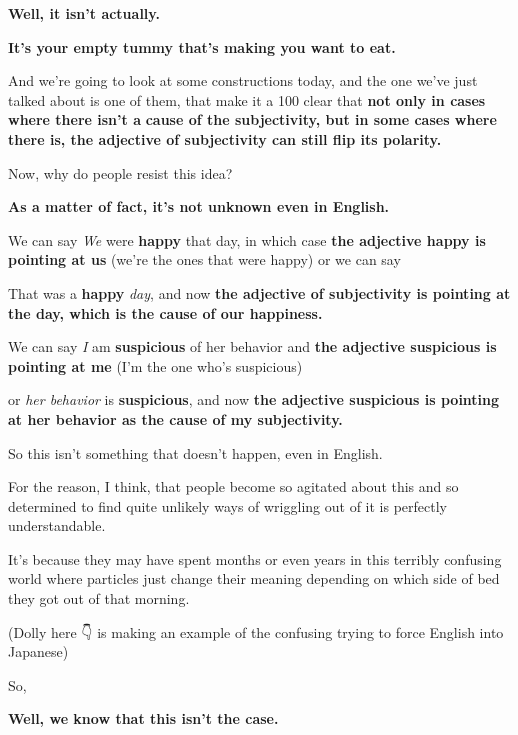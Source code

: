 {\bf Well, it isn't actually.}

{\bf It's your empty tummy that's making you want to eat.}

And we're going to look at some constructions today, and the one we've just talked about is one of them, that make it a 100 clear that {\bf not only in cases where there isn't a} {\bf cause of the subjectivity, but in some cases where there is, the adjective of subjectivity can still flip its polarity.}

Now, why do people resist this idea?

{\bf As a matter of fact, it's not unknown even in English.}

We can say {\em We} were {\bf happy} that day, in which case {\bf the adjective happy is pointing at us} (we're the ones that were happy) or we can say

That was a {\bf happy} {\em day}, and now {\bf the adjective of subjectivity is pointing at the day, which is the cause of our happiness.}

{}

We can say {\em I} am {\bf suspicious} of her behavior and {\bf the adjective suspicious is pointing at me} (I'm the one who's suspicious)

or {\em her behavior} is {\bf suspicious}, and now {\bf the adjective suspicious is pointing at her behavior as the cause of my subjectivity.}

So this isn't something that doesn't happen, even in English.

For the reason, I think, that people become so agitated about this and so determined to find quite unlikely ways of wriggling out of it is perfectly understandable.

It's because they may have spent months or even years in this terribly confusing world where particles just change their meaning depending on which side of bed they got out of that morning.

{}

(Dolly here 👇 is making an example of the confusing trying to force English into Japanese)

So, 

{\bf Well, we know that this isn't the case.}

